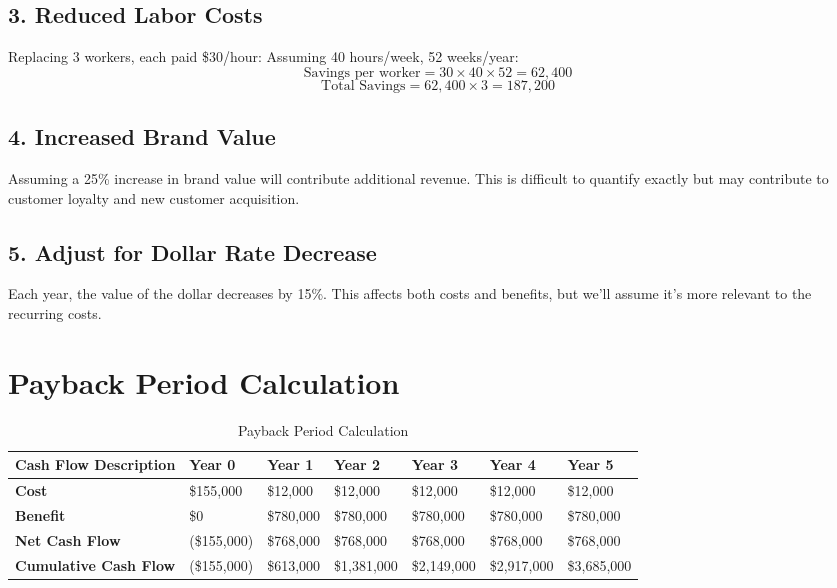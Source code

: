 \documentclass{article}
\begin{document}
\subsection*{3. Reduced Labor Costs}
Replacing 3 workers, each paid \$30/hour:
Assuming 40 hours/week, 52 weeks/year:
\[
\text{Savings per worker} = 30 \times 40 \times 52 = 62{,}400
\]
\[
\text{Total Savings} = 62{,}400 \times 3 = 187{,}200
\]

\subsection*{4. Increased Brand Value}
Assuming a 25\% increase in brand value will contribute additional revenue. This is difficult to quantify exactly but may contribute to customer loyalty and new customer acquisition.

\subsection*{5. Adjust for Dollar Rate Decrease}
Each year, the value of the dollar decreases by 15\%. This affects both costs and benefits, but we'll assume it's more relevant to the recurring costs.

\section*{Payback Period Calculation}

\begin{table}[h!]
\centering
\begin{tabular}{|p{6cm}|p{2cm}|p{2cm}|p{2cm}|p{2cm}|p{2cm}|p{2cm}|}
\hline
\textbf{Cash Flow Description} & \textbf{Year 0} & \textbf{Year 1} & \textbf{Year 2} & \textbf{Year 3} & \textbf{Year 4} & \textbf{Year 5} \\
\hline
\textbf{Cost} & \$155{,}000 & \$12{,}000 & \$12{,}000 & \$12{,}000 & \$12{,}000 & \$12{,}000 \\
\hline
\textbf{Benefit} & \$0 & \$780{,}000 & \$780{,}000 & \$780{,}000 & \$780{,}000 & \$780{,}000 \\
\hline
\textbf{Net Cash Flow} & (\$155{,}000) & \$768{,}000 & \$768{,}000 & \$768{,}000 & \$768{,}000 & \$768{,}000 \\
\hline
\textbf{Cumulative Cash Flow} & (\$155{,}000) & \$613{,}000 & \$1{,}381{,}000 & \$2{,}149{,}000 & \$2{,}917{,}000 & \$3{,}685{,}000 \\
\hline
\end{tabular}
\caption{Payback Period Calculation}
\end{table}
\end{document}
